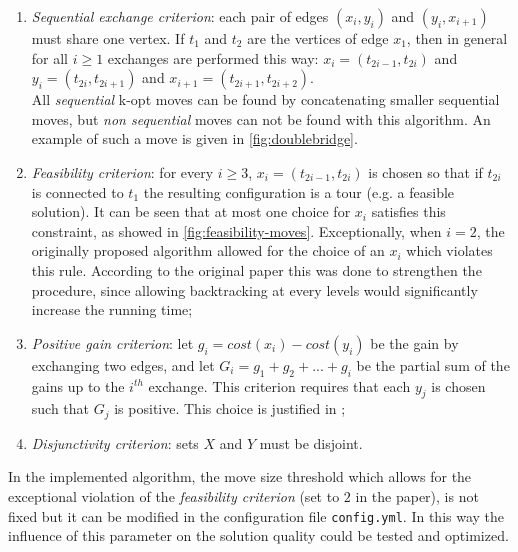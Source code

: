 \begin{enumerate}
	\item \emph{Sequential exchange criterion}: each pair of edges $(x_i, y_i)$ and $(y_i, x_{i+1})$ must share one vertex. If $t_1$ and $t_2$ are the vertices of edge $x_1$, then in general for all $i \ge 1$ exchanges are performed this way: $x_i=(t_{2i-1}, t_{2i})$ and $y_i=(t_{2i}, t_{2i+1})$ and $x_{i+1}=(t_{2i+1}, t_{2i+2})$.\\ All \emph{sequential} k-opt moves can be found by concatenating smaller sequential moves, but \emph{non sequential} moves can not be found with this algorithm. An example of such a move is given in \cref{fig:doublebridge}.
	\item \emph{Feasibility criterion}: for every $i \ge 3$, $x_i=(t_{2i-1}, t_{2i})$ is chosen so that if $t_{2i}$ is connected to $t_1$ the resulting configuration is a tour (e.g. a feasible solution). It can be seen that at most one choice for $x_i$ satisfies this constraint, as showed in \cref{fig:feasibility-moves}. Exceptionally, when $i=2$, the originally proposed algorithm allowed for the choice of an $x_i$ which violates this rule. According to the original paper this was done to strengthen the procedure, since allowing backtracking at every levels would significantly increase the running time;
	\item \emph{Positive gain criterion}: let $g_i=cost(x_i) - cost(y_i)$ be the gain by exchanging two edges, and let $G_i=g_1+g_2+...+g_i$ be the partial sum of the gains up to the $i^{th}$ exchange. This criterion requires that each $y_j$ is chosen such that $G_j$ is positive. This choice is justified in \cite{Helsgaun2000};
	\item \emph{Disjunctivity criterion}: sets $X$ and $Y$ must be disjoint.
\end{enumerate}
In the implemented algorithm, the move size threshold which allows for the exceptional violation of the \emph{feasibility criterion} (set to $2$ in the paper), is not fixed but it can be modified in the configuration file \texttt{config.yml}. In this way the influence of this parameter on the solution quality could be tested and optimized.

